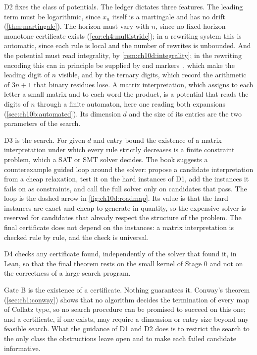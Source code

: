 D2 fixes the class of potentials. The ledger dictates three features. The
leading term must be logarithmic, since $x_n$ itself is a martingale and has no
drift (\cref{thm:martingale}). The horizon must vary with $n$, since no fixed
horizon monotone certificate exists (\cref{cor:ch4:multistride}); in a rewriting system
this is automatic, since each rule is local and the number of rewrites is
unbounded. And the potential must read integrality, by
\cref{rem:ch10d:integrality}; in the rewriting encoding this can in principle be supplied by
end markers~\cite{yolcu2023}, which make the leading digit of $n$ visible, and by the ternary
digits, which record the arithmetic of $3n+1$ that binary residues lose. A
matrix interpretation, which assigns to each letter a small matrix and to each
word the product, is a potential that reads the digits of $n$ through a finite
automaton, here one reading both expansions
(\cref{sec:ch10b:automated}). Its dimension $d$ and the size of its entries are
the two parameters of the search.

D3 is the search. For given $d$ and entry bound the existence of a matrix
interpretation under which every rule strictly decreases is a finite
constraint problem, which a SAT or SMT solver decides. The book suggests a
counterexample guided loop around the solver: propose a candidate
interpretation from a cheap relaxation, test it on the hard instances of D1,
add the instances it fails on as constraints, and call the full solver only on
candidates that pass. The loop is the dashed arrow in
\cref{fig:ch10d:roadmap}. Its value is that the hard instances are exact and
cheap to generate in quantity, so the expensive solver is reserved for
candidates that already respect the structure of the problem. The final
certificate does not depend on the instances: a matrix interpretation is
checked rule by rule, and the check is universal.

D4 checks any certificate found, independently of the solver that found it,
in Lean, so that the final theorem rests on the small kernel of Stage 0 and not
on the correctness of a large search program.

Gate B is the existence of a certificate. Nothing guarantees it. Conway's
theorem (\cref{sec:ch1:conway}) shows that no algorithm decides the
termination of every map of Collatz type, so no search procedure can be
promised to succeed on this one; and a certificate, if one exists, may require
a dimension or entry size beyond any feasible search. What the guidance of
D1 and D2 does is to restrict the search to the only class the obstructions
leave open and to make each failed candidate informative.

